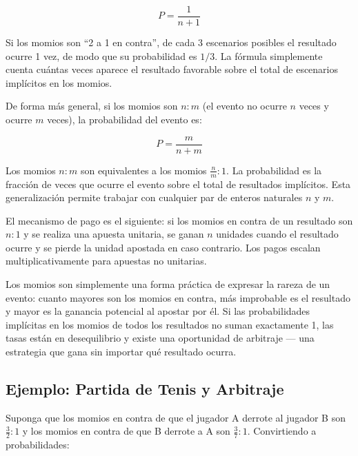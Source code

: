 \documentclass[12pt]{article}
\begin{document}
\begin{equation}
  P = \frac{1}{n+1}
\end{equation}

\begin{intuicionmat}
Si los momios son ``2 a 1 en contra'', de cada 3 escenarios posibles el
resultado ocurre 1 vez, de modo que su probabilidad es $1/3$. La f\'ormula
simplemente cuenta cu\'antas veces aparece el resultado favorable sobre el
total de escenarios impl\'icitos en los momios.
\end{intuicionmat}

De forma m\'as general, si los momios son $n:m$ (el evento no ocurre $n$
veces y ocurre $m$ veces), la probabilidad del evento es:

\begin{equation}
  P = \frac{m}{n+m}
\end{equation}

\begin{intuicionmat}
Los momios $n:m$ son equivalentes a los momios $\frac{n}{m}:1$. La
probabilidad es la fracci\'on de veces que ocurre el evento sobre el total
de resultados impl\'icitos. Esta generalizaci\'on permite trabajar con
cualquier par de enteros naturales $n$ y $m$.
\end{intuicionmat}

El mecanismo de pago es el siguiente: si los momios en contra de un resultado
son $n:1$ y se realiza una apuesta unitaria, se ganan $n$ unidades cuando el
resultado ocurre y se pierde la unidad apostada en caso contrario. Los pagos
escalan multiplicativamente para apuestas no unitarias.

\begin{intuicion}
Los momios son simplemente una forma pr\'actica de expresar la rareza de un
evento: cuanto mayores son los momios en contra, m\'as improbable es el
resultado y mayor es la ganancia potencial al apostar por \'el. Si las
probabilidades impl\'icitas en los momios de todos los resultados no suman
exactamente 1, las tasas est\'an en desequilibrio y existe una oportunidad
de arbitraje --- una estrategia que gana sin importar qu\'e resultado ocurra.
\end{intuicion}

\subsection{Ejemplo: Partida de Tenis y Arbitraje}

Suponga que los momios en contra de que el jugador A derrote al jugador B
son $\frac{3}{2}:1$ y los momios en contra de que B derrote a A son
$\frac{3}{7}:1$. Convirtiendo a probabilidades:
\end{document}
